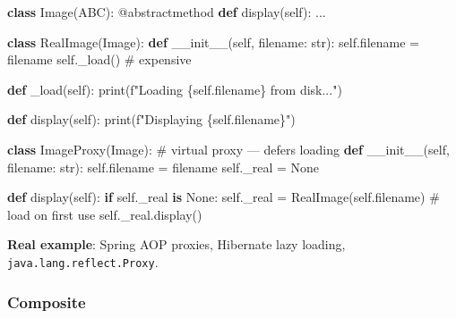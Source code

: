 \documentclass[11pt]{article}
\newenvironment{Shaded}{\begin{snugshade}}{\end{snugshade}}
\newcommand{\AttributeTok}[1]{\textcolor[rgb]{0.16,0.50,0.73}{#1}}
\newcommand{\BuiltInTok}[1]{\textcolor[rgb]{0.50,0.55,0.55}{#1}}
\newcommand{\CommentTok}[1]{\textcolor[rgb]{0.48,0.49,0.49}{#1}}
\newcommand{\ControlFlowTok}[1]{\textcolor[rgb]{0.99,0.74,0.29}{\textbf{#1}}}
\newcommand{\FunctionTok}[1]{\textcolor[rgb]{0.56,0.27,0.68}{#1}}
\newcommand{\KeywordTok}[1]{\textcolor[rgb]{0.81,0.81,0.76}{\textbf{#1}}}
\newcommand{\NormalTok}[1]{\textcolor[rgb]{0.81,0.81,0.76}{#1}}
\newcommand{\OperatorTok}[1]{\textcolor[rgb]{0.81,0.81,0.76}{#1}}
\newcommand{\SpecialCharTok}[1]{\textcolor[rgb]{0.24,0.68,0.91}{#1}}
\newcommand{\SpecialStringTok}[1]{\textcolor[rgb]{0.85,0.27,0.33}{#1}}
\newcommand{\VariableTok}[1]{\textcolor[rgb]{0.15,0.68,0.68}{#1}}
\begin{document}
\begin{Shaded}
\begin{Highlighting}[]
\KeywordTok{class}\NormalTok{ Image(ABC):}
    \AttributeTok{@abstractmethod}
    \KeywordTok{def}\NormalTok{ display(}\VariableTok{self}\NormalTok{): ...}

\KeywordTok{class}\NormalTok{ RealImage(Image):}
    \KeywordTok{def} \FunctionTok{\_\_init\_\_}\NormalTok{(}\VariableTok{self}\NormalTok{, filename: }\BuiltInTok{str}\NormalTok{):}
        \VariableTok{self}\NormalTok{.filename }\OperatorTok{=}\NormalTok{ filename}
        \VariableTok{self}\NormalTok{.\_load()               }\CommentTok{\# expensive}

    \KeywordTok{def}\NormalTok{ \_load(}\VariableTok{self}\NormalTok{):}
        \BuiltInTok{print}\NormalTok{(}\SpecialStringTok{f"Loading }\SpecialCharTok{\{}\VariableTok{self}\SpecialCharTok{.}\NormalTok{filename}\SpecialCharTok{\}}\SpecialStringTok{ from disk..."}\NormalTok{)}

    \KeywordTok{def}\NormalTok{ display(}\VariableTok{self}\NormalTok{):}
        \BuiltInTok{print}\NormalTok{(}\SpecialStringTok{f"Displaying }\SpecialCharTok{\{}\VariableTok{self}\SpecialCharTok{.}\NormalTok{filename}\SpecialCharTok{\}}\SpecialStringTok{"}\NormalTok{)}

\KeywordTok{class}\NormalTok{ ImageProxy(Image):           }\CommentTok{\# virtual proxy — defers loading}
    \KeywordTok{def} \FunctionTok{\_\_init\_\_}\NormalTok{(}\VariableTok{self}\NormalTok{, filename: }\BuiltInTok{str}\NormalTok{):}
        \VariableTok{self}\NormalTok{.filename }\OperatorTok{=}\NormalTok{ filename}
        \VariableTok{self}\NormalTok{.\_real }\OperatorTok{=} \VariableTok{None}

    \KeywordTok{def}\NormalTok{ display(}\VariableTok{self}\NormalTok{):}
        \ControlFlowTok{if} \VariableTok{self}\NormalTok{.\_real }\KeywordTok{is} \VariableTok{None}\NormalTok{:}
            \VariableTok{self}\NormalTok{.\_real }\OperatorTok{=}\NormalTok{ RealImage(}\VariableTok{self}\NormalTok{.filename)   }\CommentTok{\# load on first use}
        \VariableTok{self}\NormalTok{.\_real.display()}
\end{Highlighting}
\end{Shaded}

\textbf{Real example}: Spring AOP proxies, Hibernate lazy loading, \texttt{java.lang.reflect.Proxy}.

\subsubsection{Composite}\label{composite}
\end{document}
